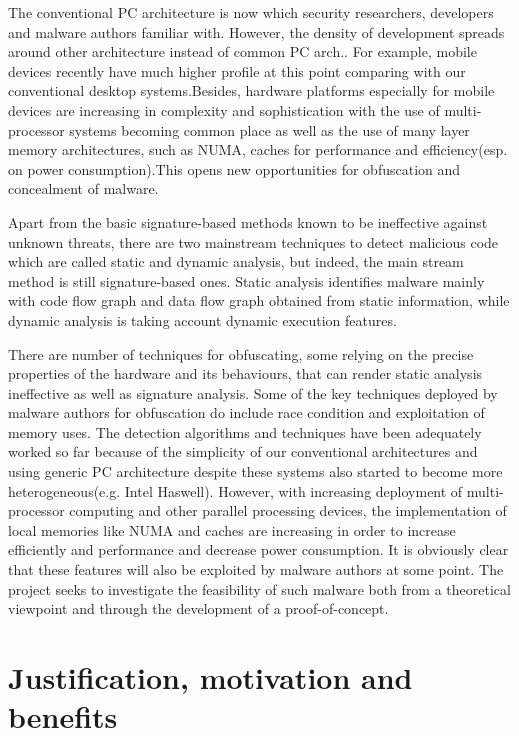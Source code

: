 The conventional PC architecture is now which security researchers, developers and malware authors familiar with. However, the density of development spreads around other architecture instead of common PC arch.. For example, mobile devices recently have much higher profile at this point comparing with our conventional desktop systems.Besides, hardware platforms especially for mobile devices are increasing in complexity and sophistication with the use of multi-processor systems becoming common place as well as the use of many layer  memory architectures, such as NUMA, caches for performance and efficiency(esp. on power consumption).This opens new opportunities for obfuscation and concealment of malware.

Apart from the basic signature-based methods known to be ineffective against unknown threats, there are two mainstream techniques to detect malicious code which are called static and dynamic analysis, but indeed, the main stream method is still signature-based ones. Static analysis identifies malware mainly with code flow graph and data flow graph obtained from static information, while dynamic analysis is taking account dynamic execution features. 

There are number of techniques for obfuscating, some relying on the precise properties of the hardware and its behaviours, that can render static analysis ineffective as well as signature analysis. Some of the key techniques deployed by malware authors for obfuscation do include race condition and exploitation of memory uses. The detection algorithms and techniques have been adequately worked so far because of the simplicity of our conventional architectures and using generic PC architecture despite these systems also started to become more heterogeneous(e.g. Intel Haswell). However, with increasing deployment of multi-processor computing and other parallel processing devices, the implementation of local memories like NUMA and caches are increasing in order to increase efficiently and performance and decrease power consumption. It is obviously clear that these features will also be exploited by malware authors at some point. The project seeks to investigate the feasibility of such malware both from a theoretical viewpoint and through the development of a proof-of-concept.

\section{Justification, motivation and benefits}


